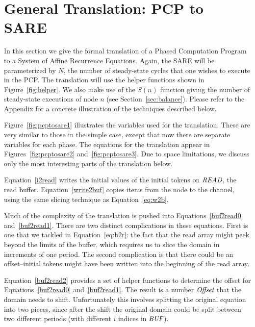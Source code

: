 \section{General Translation: PCP to SARE}
\label{sec:translate}

In this section we give the formal translation of a Phased Computation
Program to a System of Affine Recurrence Equations.  Again, the SARE
will be parameterized by $N$, the number of steady-state cycles that
one wishes to execute in the PCP.  The translation will use the helper
functions shown in Figure~\ref{fig:helper}.  We also make use of the
$S(n)$ function giving the number of steady-state executions of node
$n$ (see Section~\ref{sec:balance}).  Please refer to the Appendix for
a concrete illustration of the techniques described below.



Figure~\ref{fig:pcptosare1} illustrates the variables used for the
translation.  These are very similar to those in the simple case,
except that now there are separate variables for each phase.  The
equations for the translation appear in Figures~\ref{fig:pcptosare2}
and~\ref{fig:pcptosare3}.  Due to space limitations, we discuss only
the most interesting parts of the translation below.

Equation~\ref{i2read} writes the initial values of the initial tokens
on $\mbox{\it READ}$, the read buffer.  Equation~\ref{write2buf} copies
items from the node to the channel, using the same slicing technique
as Equation~\ref{eq:w2b}.

Much of the complexity of the translation is pushed into
Equations~\ref{buf2read0} and~\ref{buf2read1}.  There are two distinct
complications in these equations.  First is one that we tackled in
Equation~\ref{eq:b2r}: the fact that the read array might peek beyond
the limits of the buffer, which requires us to slice the domain in
increments of one period.  The second complication is that there could
be an offset--initial tokens might have been written into the
beginning of the read array.

Equation~\ref{buf2read2} provides a set of helper functions to
determine the offset for Equations~\ref{buf2read0}
and~\ref{buf2read1}.  The result is a number $\mbox{\it Offset}$ that the
domain needs to shift.  Unfortunately this involves splitting the
original equation into two pieces, since after the shift the original
domain could be split between two different periods (with different
$i$ indices in $\mbox{\it BUF}$).
